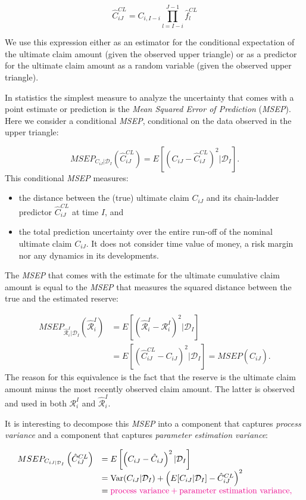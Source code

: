 \documentclass[]{book}
\providecommand{\tightlist}{%
  \setlength{\itemsep}{0pt}\setlength{\parskip}{0pt}}
\begin{document}
\[
\hat{C}_{iJ}^{CL} = C_{i,I-i} \prod_{l=I-i}^{J-1} \hat{f}_l^{CL}
\]

We use this expression either as an estimator for the conditional
expectation of the ultimate claim amount (given the observed upper
triangle) or as a predictor for the ultimate claim amount as a random
variable (given the observed upper triangle).

In statistics the simplest measure to analyze the uncertainty that comes
with a point estimate or prediction is the \emph{Mean Squared Error of
Prediction} (\emph{MSEP}). Here we consider a conditional \emph{MSEP},
conditional on the data observed in the upper triangle:

\[
MSEP_{C_{iJ}|\mathcal{D}_I}\left(\hat{C}_{iJ}^{CL}\right) = E\left[\left(C_{iJ}-\hat{C}_{iJ}^{CL}\right)^2|\mathcal{D}_I\right]. 
\] This conditional \emph{MSEP} measures:

\begin{itemize}
\tightlist
\item
  the distance between the (true) ultimate claim \(C_{iJ}\) and its
  chain-ladder predictor \(\hat{C}_{iJ}^{CL}\) at time \(I\), and
\item
  the total prediction uncertainty over the entire run-off of the
  nominal ultimate claim \(C_{iJ}\). It does not consider time value of
  money, a risk margin nor any dynamics in its developments.
\end{itemize}

The \emph{MSEP} that comes with the estimate for the ultimate cumulative
claim amount is equal to the \emph{MSEP} that measures the squared
distance between the true and the estimated reserve:

\[
\begin{array}{rl}
MSEP_{\hat{\mathcal{R}}^{I}_{i}|\mathcal{D}_I}(\hat{\mathcal{R}}^{I}_i) &= E[(\hat{\mathcal{R}}^I_i-\mathcal{R}^I_i)^2|\mathcal{D}_I] \\
&= E[(\hat{C}^{CL}_{iJ}-C_{iJ})^2|\mathcal{D}_I] = MSEP(\hat{C}_{iJ}). 
\end{array}
\] The reason for this equivalence is the fact that the reserve is the
ultimate claim amount minus the most recently observed claim amount. The
latter is observed and used in both \(\mathcal{R}^I_i\) and
\(\hat{\mathcal{R}}^I_i\).

It is interesting to decompose this \emph{MSEP} into a component that
captures \emph{process variance} and a component that captures
\emph{parameter estimation variance}:

\[
\begin{array}{rl}
MSEP_{C_{iJ|\mathcal{D}_I}}\left(\hat{C}_{iJ}^{CL}\right) &=
E\left[ \left( C_{iJ} - \hat{C}_{iJ} \right)^2 | \mathcal{D}_I\right] \\
&= \text{Var}(C_{iJ}|\mathcal{D}_I) + \left( E[C_{iJ}|\mathcal{D}_I]-\hat{C}_{iJ}^{CL} \right)^2 \\
&= \color{magenta}{\text{process variance}} + \color{magenta}{\text{parameter estimation variance}},
\end{array}
\]
\end{document}
